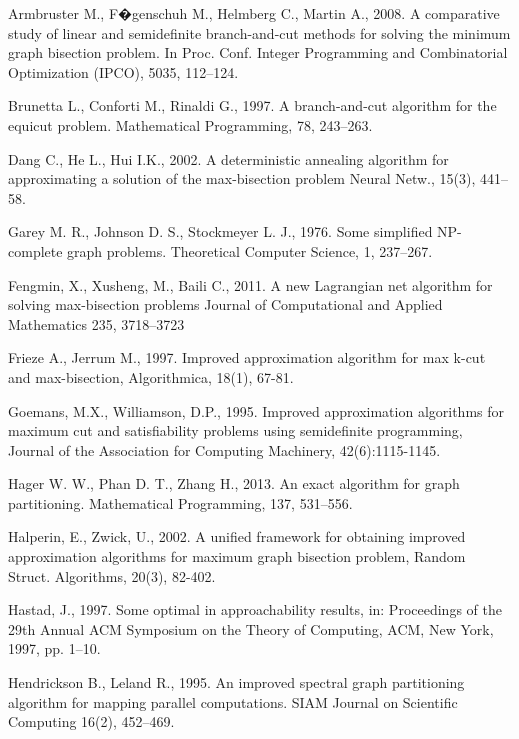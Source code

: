 \documentclass[10pt]{article}
\begin{document}
\begin{thebibliography}{00}


Armbruster  M., F�genschuh M., Helmberg C., Martin A., 2008. A comparative study of linear and semidefinite
branch-and-cut methods for solving the minimum graph bisection problem. In Proc. Conf. Integer Programming
and Combinatorial Optimization (IPCO), 5035, 112--124.

Brunetta  L., Conforti M., Rinaldi G., 1997. A branch-and-cut algorithm for the equicut problem. Mathematical
Programming, 78,  243--263.


Dang C., He L., Hui I.K., 2002.
A deterministic annealing algorithm for approximating a solution of the max-bisection problem
Neural Netw., 15(3), 441--58.


Garey M. R., Johnson D. S., Stockmeyer L. J., 1976. Some simplified NP-complete graph problems. Theoretical
Computer Science, 1, 237--267.

Fengmin, X.,   Xusheng, M.,  Baili C., 2011.
A new Lagrangian net algorithm for solving max-bisection problems
Journal of Computational and Applied Mathematics 235, 3718--3723


Frieze A., Jerrum M., 1997. Improved approximation algorithm for max k-cut and
max-bisection, Algorithmica, 18(1), 67-81.

 Goemans, M.X.,  Williamson, D.P., 1995. Improved approximation algorithms for
maximum cut and satisfiability problems using semidefinite programming,
Journal of the Association for Computing Machinery, 42(6):1115-1145.


Hager W. W., Phan D. T., Zhang H., 2013. An exact algorithm for graph partitioning. Mathematical Programming,
137, 531--556.

Halperin, E., Zwick, U., 2002. A unified framework for obtaining improved
approximation algorithms for maximum graph bisection problem, Random
Struct. Algorithms, 20(3), 82-402.


 Hastad, J., 1997. Some optimal in approachability results, in: Proceedings of the 29th Annual ACM Symposium on the Theory of Computing, ACM, New York,
1997, pp. 1--10.


Hendrickson B., Leland R., 1995. An improved spectral graph partitioning algorithm for mapping parallel computations. 
SIAM Journal on Scientific Computing 16(2),  452--469.


\end{thebibliography}
\end{document}

